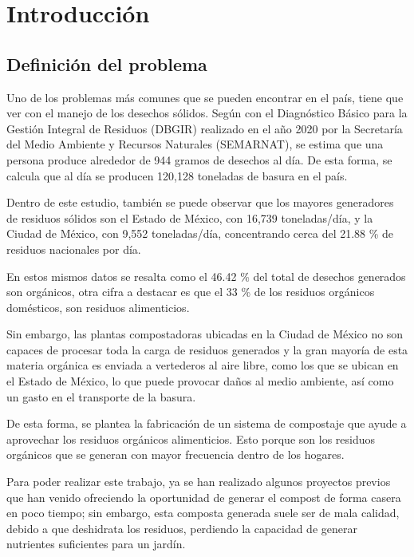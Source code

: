 
\chapter{Introducción}


\section{Definición del problema}

Uno de los problemas más comunes que se pueden encontrar en el país, tiene que ver con el manejo de los desechos sólidos. Según con el Diagnóstico Básico para la Gestión Integral de Residuos (DBGIR) realizado en el año 2020 por la Secretaría del Medio Ambiente y Recursos Naturales (SEMARNAT), se estima que una persona produce alrededor de 944 gramos de desechos al día. De esta forma, se calcula que al día se producen 120,128 toneladas de basura en el país. \cite{ANP2021} 

Dentro de este estudio, también se puede observar que los mayores generadores de residuos sólidos son el Estado de México, con 16,739 toneladas/día, y la Ciudad de México, con 9,552 toneladas/día, concentrando cerca del 21.88 \% de residuos nacionales por día. \cite{SEMARNAT2020}

En estos mismos datos se resalta como el 46.42 \% del total de desechos generados son orgánicos, otra cifra a destacar es que el 33 \% de los residuos orgánicos domésticos, son residuos alimenticios. \cite{SEMARNAT2020}

Sin embargo, las plantas compostadoras ubicadas en la Ciudad de México no son capaces de procesar toda la carga de residuos generados y la gran mayoría de esta materia orgánica es enviada a vertederos al aire libre, como los que se ubican en el Estado de México, lo que puede provocar daños al medio ambiente, así como un gasto en el transporte de la basura. \cite{SEMACDMX2021}

De esta forma, se plantea la fabricación de un sistema de compostaje que ayude a aprovechar los residuos orgánicos alimenticios. Esto porque son los residuos orgánicos que se generan con mayor frecuencia dentro de los hogares.

Para poder realizar este trabajo, ya se han realizado algunos proyectos previos que han venido ofreciendo la oportunidad de generar el compost de forma casera en poco tiempo; sin embargo, esta composta generada suele ser de mala calidad, debido a que deshidrata los residuos, perdiendo la capacidad de generar nutrientes suficientes para un jardín. 

